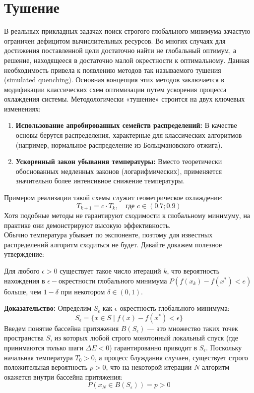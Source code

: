 \section{Тушение}
В реальных прикладных задачах поиск строгого глобального минимума зачастую ограничен дефицитом вычислительных ресурсов. Во многих случаях для достижения поставленной цели достаточно найти не глобальный оптимум, а решение, находящееся в достаточно малой окрестности к оптимальному.
Данная необходимость привела к появлению методов так называемого тушения (simulated quenching). Основная концепция этих методов заключается в модификации классических схем оптимизации путем ускорения процесса охлаждения системы.
Методологически «тушение» строится на двух ключевых изменениях: \\
\begin{enumerate}
\item \textbf{Использование апробированных семейств распределений:} В качестве основы берутся распределения, характерные для классических алгоритмов (например, нормальное распределение из Больцмановского отжига).
\item \textbf{Ускоренный закон убывания температуры:} Вместо теоретически обоснованных медленных законов (логарифмических), применяется значительно более интенсивное снижение температуры.
\end{enumerate}
Примером реализации такой схемы служит геометрическое охлаждение:
\begin{equation*}
T_{k+1} = c \cdot T_k, \quad \text{где } c \in (0.7; 0.9)
\end{equation*}
Хотя подобные методы не гарантируют сходимости к глобальному минимуму, на практике они демонстрируют высокую эффективность. \\
Обычно температура убывает по экспоненте, поэтому для известных распределений алгоритм сходиться не будет. Давайте докажем полезное утверждение:
\begin{tcolorbox}[colback=gray!5!white, colframe=gray!75!black]
Для любого $\epsilon > 0$ существует такое число итераций $k$, что вероятность нахождения в $\epsilon-\text{окрестности}$ глобального минимума $P(f(x_k)-f(x^*)<e)$ больше, чем $1-\delta$ при некотором $\delta \in (0, 1).$
\end{tcolorbox}
\textbf{Доказательство:} 
Определим $S_\epsilon$ как $\epsilon$-окрестность глобального минимума:
$$S_\epsilon = \{x \in S \mid f(x) - f(x^*) < \epsilon\}$$ 
Введем понятие бассейна притяжения $B(S_\epsilon)$ — это множество таких точек пространства $S$, из которых любой строго монотонный локальный спуск (где принимаются только шаги $\Delta E < 0$) гарантированно приводит в $S_\epsilon$.
Поскольку начальная температура $T_0 > 0$, а процесс блуждания случаен, существует строго положительная вероятность $p > 0$, что на некоторой итерации $N$ алгоритм окажется внутри бассейна притяжения:
$$P(x_N \in B(S_\epsilon)) = p > 0$$

